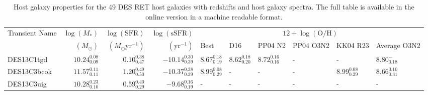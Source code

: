 \documentclass[fleqn,usenatbib,]{mnras}
\begin{document}
\begin{table}

\caption{Host galaxy properties for the 49 DES RET host galaxies with redshifts and host galaxy spectra. The full table is available in the online version in a machine readable format.}
\begin{threeparttable}
\begin{tabular}{lrrrllllll}
\toprule
Transient Name &$\log \left(M_*\right)$ &$\log \left(\mathrm{SFR}\right)$ &  $\log \left(\mathrm{sSFR}\right)$ &                                                           \multicolumn{6}{c}{$12+\log\left(\mathrm{O/H}\right) $}\\
{} & $\left( M_{\odot}\right)$ & $\left(M_{\odot} \mathrm{yr}^{-1}\right)$&$\left(\mathrm{yr}^{-1} \right)$& Best\tnote{a} &                                                           D16 &                                                       PP04 N2 &                                                     PP04 O3N2 &                                                      KK04 R23 &                                                   Average O3N2\tnote{b}\\
\midrule
DES13C1tgd  &  $10.24 _{\scriptscriptstyle 0.09} ^{\scriptscriptstyle 0.08}$ &   $0.10 _{\scriptscriptstyle 0.47} ^{\scriptscriptstyle 0.38}$ &  $-10.14 _{\scriptscriptstyle 0.39} ^{\scriptscriptstyle 0.30}$ &  $8.67 _{\scriptscriptstyle 0.19} ^{\scriptscriptstyle 0.18}$ &  $8.62 _{\scriptscriptstyle 0.20} ^{\scriptscriptstyle 0.18}$ &  $8.72 _{\scriptscriptstyle 0.16} ^{\scriptscriptstyle 0.16}$ &                                                             - &                                                             - &     $8.80 _{\scriptscriptstyle 0.18} ^{\scriptscriptstyle -}$ \\
DES13C3bcok &  $11.57 _{\scriptscriptstyle 0.11} ^{\scriptscriptstyle 0.11}$ &   $1.20 _{\scriptscriptstyle 0.50} ^{\scriptscriptstyle 0.49}$ &  $-10.37 _{\scriptscriptstyle 0.39} ^{\scriptscriptstyle 0.38}$ &  $8.99 _{\scriptscriptstyle 0.29} ^{\scriptscriptstyle 0.08}$ &                                                             - &                                                             - &                                                             - &  $8.99 _{\scriptscriptstyle 0.29} ^{\scriptscriptstyle 0.08}$ &  $8.66 _{\scriptscriptstyle 0.31} ^{\scriptscriptstyle 0.10}$ \\
DES13C3uig  &  $10.28 _{\scriptscriptstyle 0.10} ^{\scriptscriptstyle 0.23}$ &   $0.59 _{\scriptscriptstyle 0.29} ^{\scriptscriptstyle 0.40}$ &   $-9.68 _{\scriptscriptstyle 0.19} ^{\scriptscriptstyle 0.16}$ &                                                             - &                                                             - &                                                             - &                                                             - &                                                             - &                                                             - \\

\end{tabular}
\end{threeparttable}
\end{table}
\end{document}
